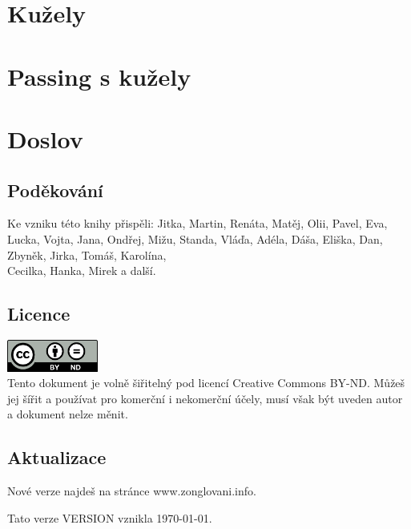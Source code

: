 \documentclass[12pt,a4paper,twoside]{book}
\begin{document}


\chapter{Kužely}



\chapter{Passing s kužely}



\chapter{Doslov}
\section{Poděkování}
Ke vzniku této knihy přispěli: Jitka, Martin, Renáta, Matěj, Olii, Pavel, Eva, Lucka, Vojta, Jana, Ondřej, Mižu, Standa, Vláďa, Adéla, Dáša, Eliška, Dan, Zbyněk, Jirka, Tomáš, Karolína,\\Cecilka, Hanka, Mirek a další.
\section{Licence}
\includegraphics[width=3cm]{obrazky/cc-by-nd.png}\\
Tento dokument je volně šiřitelný pod licencí Creative Commons BY-ND.
Můžeš jej šířit a používat pro komerční i nekomerční účely, musí však být uveden autor a dokument nelze měnit.
\section{Aktualizace}
Nové verze najdeš na stránce www.zonglovani.info.

Tato verze VERSION vznikla \today.
\end{document}
